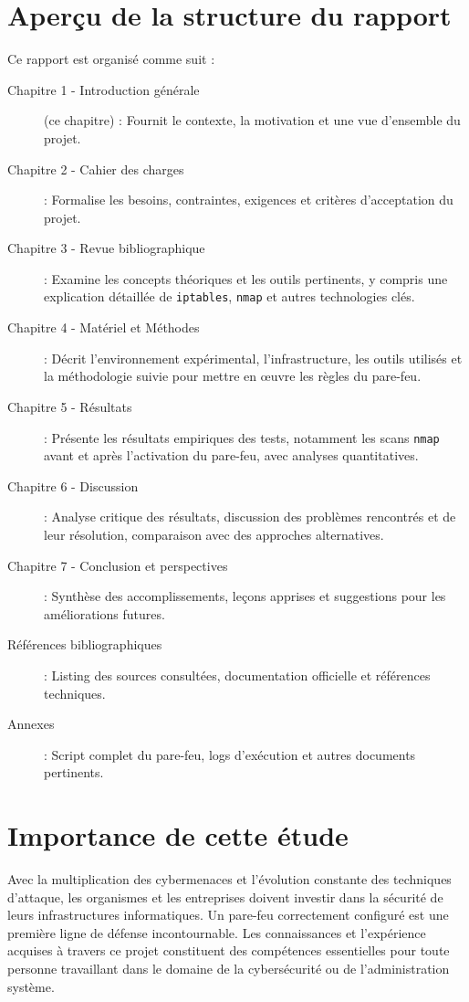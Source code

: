 \section{Aperçu de la structure du rapport}

Ce rapport est organisé comme suit :

\begin{description}
    \item[Chapitre 1 - Introduction générale] (ce chapitre) : Fournit le contexte, la motivation et une vue d'ensemble du projet.
    
    \item[Chapitre 2 - Cahier des charges] : Formalise les besoins, contraintes, exigences et critères d'acceptation du projet.
    
    \item[Chapitre 3 - Revue bibliographique] : Examine les concepts théoriques et les outils pertinents, y compris une explication détaillée de \texttt{iptables}, \texttt{nmap} et autres technologies clés.
    
    \item[Chapitre 4 - Matériel et Méthodes] : Décrit l'environnement expérimental, l'infrastructure, les outils utilisés et la méthodologie suivie pour mettre en œuvre les règles du pare-feu.
    
    \item[Chapitre 5 - Résultats] : Présente les résultats empiriques des tests, notamment les scans \texttt{nmap} avant et après l'activation du pare-feu, avec analyses quantitatives.
    
    \item[Chapitre 6 - Discussion] : Analyse critique des résultats, discussion des problèmes rencontrés et de leur résolution, comparaison avec des approches alternatives.
    
    \item[Chapitre 7 - Conclusion et perspectives] : Synthèse des accomplissements, leçons apprises et suggestions pour les améliorations futures.
    
    \item[Références bibliographiques] : Listing des sources consultées, documentation officielle et références techniques.
    
    \item[Annexes] : Script complet du pare-feu, logs d'exécution et autres documents pertinents.
\end{description}

\section{Importance de cette étude}

Avec la multiplication des cybermenaces et l'évolution constante des techniques d'attaque, les organismes et les entreprises doivent investir dans la sécurité de leurs infrastructures informatiques. Un pare-feu correctement configuré est une première ligne de défense incontournable. Les connaissances et l'expérience acquises à travers ce projet constituent des compétences essentielles pour toute personne travaillant dans le domaine de la cybersécurité ou de l'administration système.
